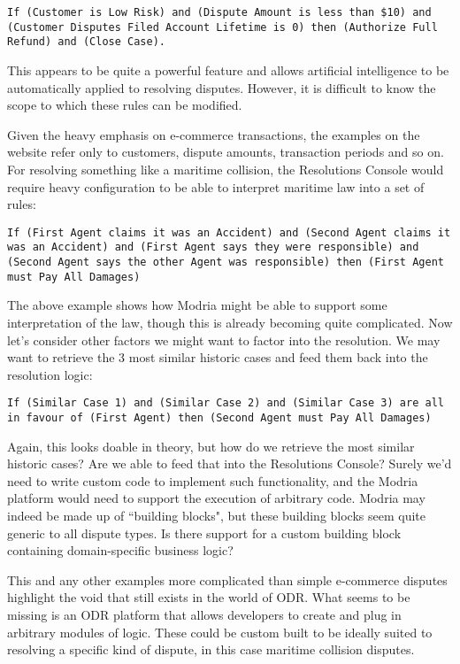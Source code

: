 \begin{lstlisting}
If (Customer is Low Risk) and (Dispute Amount is less than $10) and (Customer Disputes Filed Account Lifetime is 0) then (Authorize Full Refund) and (Close Case).
\end{lstlisting}

This appears to be quite a powerful feature and allows artificial intelligence to be automatically applied to resolving disputes. However, it is difficult to know the scope to which these rules can be modified.

Given the heavy emphasis on e-commerce transactions, the examples on the website refer only to customers, dispute amounts, transaction periods and so on. For resolving something like a maritime collision, the Resolutions Console would require heavy configuration to be able to interpret maritime law into a set of rules:

\begin{lstlisting}
If (First Agent claims it was an Accident) and (Second Agent claims it was an Accident) and (First Agent says they were responsible) and (Second Agent says the other Agent was responsible) then (First Agent must Pay All Damages)
\end{lstlisting}

The above example shows how Modria might be able to support some interpretation of the law, though this is already becoming quite complicated. Now let's consider other factors we might want to factor into the resolution. We may want to retrieve the 3 most similar historic cases and feed them back into the resolution logic:

\begin{lstlisting}
If (Similar Case 1) and (Similar Case 2) and (Similar Case 3) are all in favour of (First Agent) then (Second Agent must Pay All Damages)
\end{lstlisting}

Again, this looks doable in theory, but how do we retrieve the most similar historic cases? Are we able to feed that into the Resolutions Console? Surely we'd need to write custom code to implement such functionality, and the Modria platform would need to support the execution of arbitrary code. Modria may indeed be made up of ``building blocks", but these building blocks seem quite generic to all dispute types. Is there support for a custom building block containing domain-specific business logic?

This and any other examples more complicated than simple e-commerce disputes highlight the void that still exists in the world of ODR. What seems to be missing is an ODR platform that allows developers to create and plug in arbitrary modules of logic. These could be custom built to be ideally suited to resolving a specific kind of dispute, in this case maritime collision disputes.

